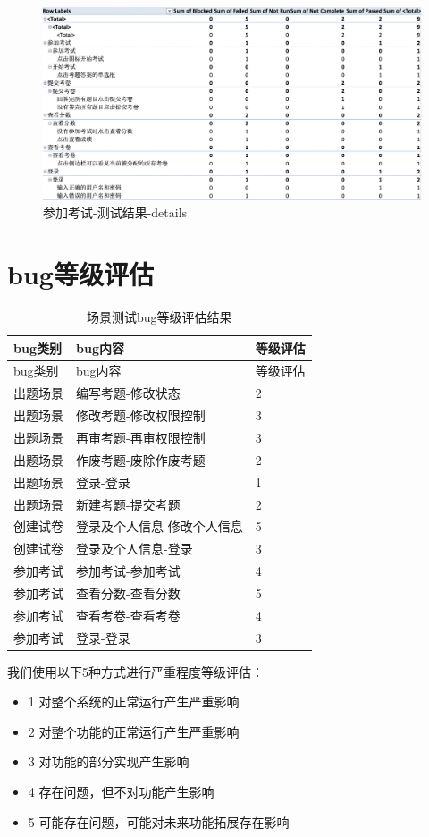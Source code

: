 \documentclass[hyperref, a4paper]{ctexart}
\providecommand{\tightlist}{%
  \setlength{\itemsep}{0pt}\setlength{\parskip}{0pt}}
\begin{document}
\begin{figure}
\centering
\includegraphics{screenshoots/PivotTable_Details_3.png}
\caption{参加考试-测试结果-details}
\end{figure}

\hypertarget{bugux7b49ux7ea7ux8bc4ux4f30}{%
\section{bug等级评估}\label{bugux7b49ux7ea7ux8bc4ux4f30}}

\begin{longtable}[]{@{}lll@{}}
\caption{场景测试bug等级评估结果}\tabularnewline
\toprule
bug类别 & bug内容 & 等级评估\tabularnewline
\midrule
\endfirsthead
\toprule
bug类别 & bug内容 & 等级评估\tabularnewline
\midrule
\endhead
出题场景 & 编写考题-修改状态 & 2\tabularnewline
出题场景 & 修改考题-修改权限控制 & 3\tabularnewline
出题场景 & 再审考题-再审权限控制 & 3\tabularnewline
出题场景 & 作废考题-废除作废考题 & 2\tabularnewline
出题场景 & 登录-登录 & 1\tabularnewline
出题场景 & 新建考题-提交考题 & 2\tabularnewline
创建试卷 & 登录及个人信息-修改个人信息 & 5\tabularnewline
创建试卷 & 登录及个人信息-登录 & 3\tabularnewline
参加考试 & 参加考试-参加考试 & 4\tabularnewline
参加考试 & 查看分数-查看分数 & 5\tabularnewline
参加考试 & 查看考卷-查看考卷 & 4\tabularnewline
参加考试 & 登录-登录 & 3\tabularnewline
\bottomrule
\end{longtable}

\pagebreak

我们使用以下5种方式进行严重程度等级评估：

\begin{itemize}
\tightlist
\item
  1 对整个系统的正常运行产生严重影响
\item
  2 对整个功能的正常运行产生严重影响
\item
  3 对功能的部分实现产生影响
\item
  4 存在问题，但不对功能产生影响
\item
  5 可能存在问题，可能对未来功能拓展存在影响
\end{itemize}
\end{document}
